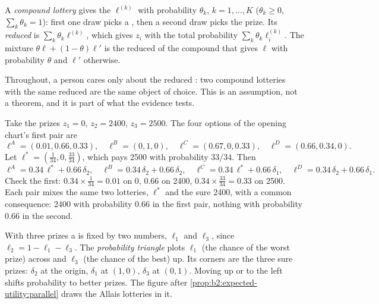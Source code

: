 \begin{definition}\label{def:b2:expected-utility:compound-lottery}
A \emph{compound lottery} gives the  $\ell^{(k)}$ with probability
$\theta_k$, $k = 1, \dots, K$ ($\theta_k \ge 0$, $\sum_k \theta_k = 1$): first one draw picks a ,
then a second draw picks the prize. Its \emph{reduced } is $\sum_k \theta_k \ell^{(k)}$, which
gives $z_i$ with the total probability $\sum_k \theta_k \ell^{(k)}_i$. The mixture $\theta\ell +
(1-\theta)\ell'$ is the reduced  of the compound  that gives $\ell$ with probability
$\theta$ and $\ell'$ otherwise.
\end{definition}

Throughout, a person cares only about the reduced : two compound lotteries with the same
reduced  are the same object of choice. This is an assumption, not a theorem, and it is part
of what the evidence tests.

\begin{example}\label{ex:b2:expected-utility:allais-lotteries}
Take the prizes $z_1 = 0$, $z_2 = \num{2400}$, $z_3 = \num{2500}$. The four options of the opening
chart's first pair are
\[
\ell^{A} = (0.01, 0.66, 0.33),\quad \ell^{B} = (0, 1, 0),\quad
\ell^{C} = (0.67, 0, 0.33),\quad \ell^{D} = (0.66, 0.34, 0).
\]
Let $\ell^{*} = (\tfrac{1}{34}, 0, \tfrac{33}{34})$, which pays \num{2500} with probability $33/34$.
Then
\[
\ell^{A} = 0.34\,\ell^{*} + 0.66\,\delta_2,\quad \ell^{B} = 0.34\,\delta_2 + 0.66\,\delta_2,\quad
\ell^{C} = 0.34\,\ell^{*} + 0.66\,\delta_1,\quad \ell^{D} = 0.34\,\delta_2 + 0.66\,\delta_1 .
\]
Check the first: $0.34 \times \tfrac{1}{34} = 0.01$ on $0$, $0.66$ on \num{2400}, $0.34 \times
\tfrac{33}{34} = 0.33$ on \num{2500}. Each pair mixes the same two lotteries, $\ell^{*}$ and the sure
\num{2400}, with a common consequence: \num{2400} with probability $0.66$ in the first pair, nothing
with probability $0.66$ in the second.
\end{example}

With three prizes a  is fixed by two numbers, $\ell_1$ and $\ell_3$, since $\ell_2 = 1 - \ell_1
- \ell_3$. The \emph{probability triangle} plots $\ell_1$ (the chance of the worst prize) across and
$\ell_3$ (the chance of the best) up. Its corners are the three sure prizes: $\delta_2$ at the origin,
$\delta_1$ at $(1, 0)$, $\delta_3$ at $(0, 1)$. Moving up or to the left shifts probability to better
prizes. The figure after \cref{prop:b2:expected-utility:parallel} draws the Allais lotteries in it.

